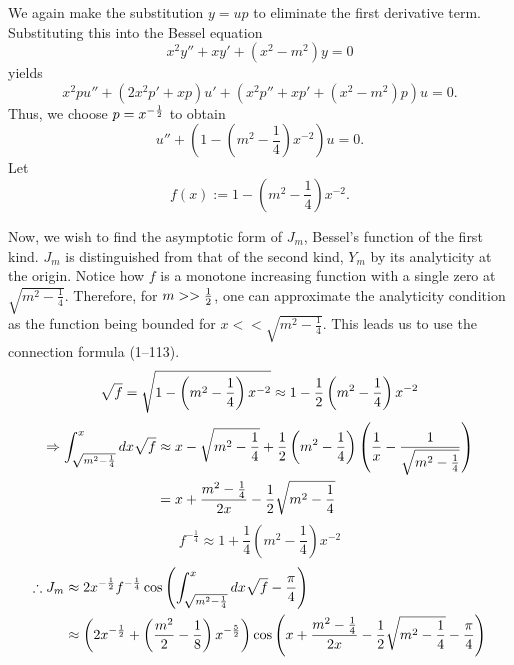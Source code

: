 \item
We again make the substitution $y = up$ to eliminate the first derivative term.
Substituting this into the Bessel equation
\[
	x^2 y'' + xy' + \left( x^2 - m^2 \right) y = 0
\]
yields
\[
	x^2 pu'' + \left( 2x^2 p' + xp \right)u' + \left( x^2 p'' + xp' + \left( x^2 - m^2 \right)p \right)u = 0.
\]
Thus, we choose $p = x^{-\frac{1}{2}}$ to obtain
\[
	u'' + \left( 1 - \left( m^2 - \frac{1}{4} \right) x^{-2} \right) u = 0.
\]
Let
\[
	f(x) := 1 - \left( m^2 - \frac{1}{4} \right) x^{-2}.
\]

Now, we wish to find the asymptotic form of $J_m$, Bessel's function of the first kind.
$J_m$ is distinguished from that of the second kind, $Y_m$ by its analyticity at the origin.
Notice how $f$ is a monotone increasing function with a single zero at $\sqrt{m^2 - \frac{1}{4}}$.
Therefore, for $m >> \frac{1}{2}$, one can approximate the analyticity condition as the function being bounded for $x << \sqrt{m^2 - \frac{1}{4}}$.
This leads us to use the connection formula  (1--113).
\[
	\sqrt{f}
	= \sqrt{1 - \left( m^2 - \frac{1}{4} \right) x^{-2}}
	\approx 1 - \frac{1}{2} \left( m^2 - \frac{1}{4} \right) x^{-2}
\]
\begin{align*}
	\Rightarrow \int_{\sqrt{m^2 - \frac{1}{4}}}^{x} dx \sqrt{f}
	 & \approx x - \sqrt{m^2 - \frac{1}{4}} + \frac{1}{2} \left( m^2 - \frac{1}{4} \right) \left( \frac{1}{x} - \frac{1}{\sqrt{m^2 - \frac{1}{4}}} \right) \\
	 & = x + \frac{m^2 - \frac{1}{4}}{2x} - \frac{1}{2}\sqrt{m^2 - \frac{1}{4}}
\end{align*}
\[
	f^{-\frac{1}{4}} \approx 1 + \frac{1}{4} \left( m^2 - \frac{1}{4} \right) x^{-2}
\]
\begin{align*}
	\therefore J_m
	 & \approx 2 x^{-\frac{1}{2}} f^{-\frac{1}{4}} \cos\left( \int_{\sqrt{m^2 - \frac{1}{4}}}^{x} dx \sqrt{f} - \frac{\pi}{4} \right) \\
	 & \approx \left( 2x^{-\frac{1}{2}} + \left( \frac{m^2}{2} - \frac{1}{8} \right) x^{-\frac{5}{2}} \right)
	\cos\left( x + \frac{m^2 - \frac{1}{4}}{2x} - \frac{1}{2}\sqrt{m^2 - \frac{1}{4}} - \frac{\pi}{4} \right)
\end{align*}
